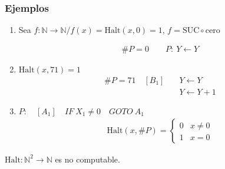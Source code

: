 \subsubsection{Ejemplos}

\begin{enumerate}
    \item Sea $f: \mathbb{N} \to \mathbb{N} / f(x) = \mathrm{Halt}(x,0) = 1$, 
    $f = \mathrm{SUC} \circ \mathrm{cero}$
    
    \begin{gather*}
        \# P = 0 \qquad P: ~ Y \gets Y
    \end{gather*}

    \item $\mathrm{Halt}(x,71) = 1$
    \begin{align*}
        \#P = 71 \quad [B_1] \quad &Y \gets Y\\
                                   &Y \gets Y+1
    \end{align*}

     \item $P: \quad [A_1] \quad IF ~ X_1 \neq 0 \quad GOTO ~ A_1$
         \begin{gather*}
             \mathrm{Halt}(x,\#P) = 
             \begin{cases}
                 0 & x \neq 0\\
                 1 & x = 0
             \end{cases}
         \end{gather*}
\end{enumerate}

\begin{teorema}{}{}

 $\mathrm{Halt}: \mathbb{N}^2 \to \mathbb{N}$ es no computable.
    
\end{teorema}

